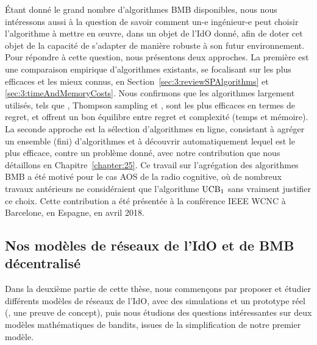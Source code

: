 \begin{resume_fr}
%
Étant donné le grand nombre d'algorithmes BMB disponibles, nous nous intéressons aussi à la question de savoir comment un-e ingénieur-e peut choisir l'algorithme à mettre en œuvre, dans un objet de l'IdO donné, afin de doter cet objet de la capacité de s'adapter de manière robuste à son futur environnement.
Pour répondre à cette question, nous présentons deux approches.
La première est une comparaison empirique d'algorithmes existants, se focalisant sur les plus efficaces et les mieux connus, en Section~\ref{sec:3:reviewSPAlgorithms} et \ref{sec:3:timeAndMemoryCosts}.
Nous confirmons que les algorithmes largement utilisés, tels que \UCB{} \cite{Auer02}, Thompson sampling \cite{Thompson33} et \klUCB{} \cite{KLUCBJournal}, sont les plus efficaces en termes de regret, et offrent un bon équilibre entre regret et complexité (temps et mémoire).
La seconde approche est la sélection d'algorithmes en ligne, consistant à agréger un ensemble (fini) d'algorithmes et à découvrir automatiquement lequel est le plus efficace, contre un problème donné, avec notre contribution \Aggr{} que nous détaillons en Chapitre~\ref{chapter:25}.
Ce travail sur l'agrégation des algorithmes BMB a été motivé pour le cas AOS de la radio cognitive, où de nombreux travaux antérieurs ne considéraient que l'algorithme $\mathrm{UCB}_1$ sans vraiment justifier ce choix.
Cette contribution a été présentée à la conférence IEEE WCNC à Barcelone, en Espagne, en avril 2018.


\subsection*{Nos modèles de réseaux de l'IdO et de BMB décentralisé}

Dans la deuxième partie de cette thèse, nous commençons par proposer et étudier différents modèles de réseaux de l'IdO, avec des simulations et un prototype réel (\ie, une preuve de concept), puis nous étudions des questions intéressantes sur deux modèles mathématiques de bandits, issues de la simplification de notre premier modèle.



\end{resume_fr}
